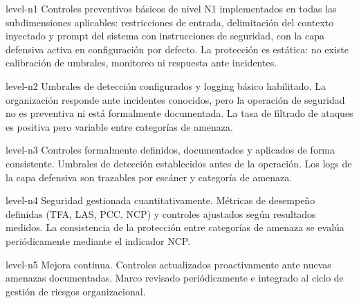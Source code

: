 \begin{levelbox}[title=N1: Inicial]{level-n1}
  Controles preventivos básicos de nivel N1 implementados en todas las subdimensiones aplicables: restricciones de entrada, delimitación del contexto inyectado y prompt del sistema con instrucciones de seguridad, con la capa defensiva activa en configuración por defecto. La protección es estática: no existe calibración de umbrales, monitoreo ni respuesta ante incidentes.
\end{levelbox}

\vspace{8pt}

\begin{levelbox}[title=N2: Reactivo]{level-n2}
  Umbrales de detección configurados y logging básico habilitado. La organización responde ante incidentes conocidos, pero la operación de seguridad no es preventiva ni está formalmente documentada. La tasa de filtrado de ataques es positiva pero variable entre categorías de amenaza.
\end{levelbox}

\vspace{8pt}

\begin{levelbox}[title=N3: Definido]{level-n3}
  Controles formalmente definidos, documentados y aplicados de forma consistente. Umbrales de detección establecidos antes de la operación. Los logs de la capa defensiva son trazables por escáner y categoría de amenaza.
\end{levelbox}

\vspace{8pt}

\begin{levelbox}[title=N4: Gestionado]{level-n4}
  Seguridad gestionada cuantitativamente. Métricas de desempeño definidas (TFA, LAS, PCC, NCP) y controles ajustados según resultados medidos. La consistencia de la protección entre categorías de amenaza se evalúa periódicamente mediante el indicador NCP.
\end{levelbox}

\vspace{8pt}

\begin{levelbox}[title=N5: Optimizado]{level-n5}
  Mejora continua. Controles actualizados proactivamente ante nuevas amenazas documentadas. Marco revisado periódicamente e integrado al ciclo de gestión de riesgos organizacional.
\end{levelbox}

